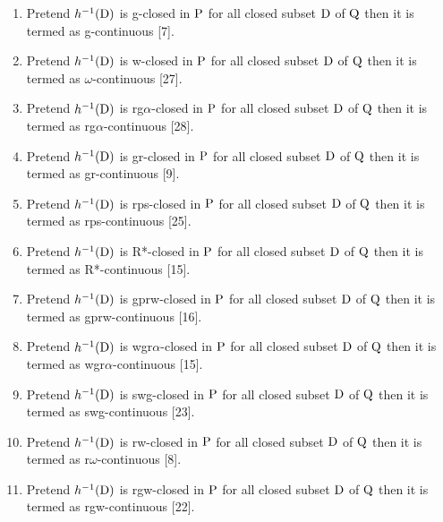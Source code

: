 \begin{dfn}
\begin{enumerate}
\item  Pretend $h^{-1}(\mathrm{D})$ is g-closed in $\mathrm{P}$ for all closed subset $\mathrm{D}$ of $\mathrm{Q}$ then it is termed as g-continuous [7]. 
\item  Pretend $h^{-1}(\mathrm{D})$ is w-closed in $\mathrm{P}$ for all closed subset $\mathrm{D}$ of $\mathrm{Q}$ then it is termed as $\omega$-continuous [27]. 
\item  Pretend $h^{-1}(\mathrm{D})$ is rg$\alpha$-closed in $\mathrm{P}$ for all closed subset $\mathrm{D}$ of $\mathrm{Q}$ then it is termed as rg$\alpha$-continuous [28]. 
\item  Pretend $h^{-1}(\mathrm{D})$ is gr-closed in $\mathrm{P}$ for all closed subset $\mathrm{D}$ of $\mathrm{Q}$ then it is termed as gr-continuous [9]. 
\item  Pretend $h^{-1}(\mathrm{D})$ is rps-closed in $\mathrm{P}$ for all closed subset $\mathrm{D}$ of $\mathrm{Q}$ then it is termed as rps-continuous [25]. 
\item  Pretend $h^{-1}(\mathrm{D})$ is R*-closed in $\mathrm{P}$ for all closed subset $\mathrm{D}$ of $\mathrm{Q}$ then it is termed as R*-continuous [15]. 
\item  Pretend $h^{-1}(\mathrm{D})$ is gprw-closed in $\mathrm{P}$ for all closed subset $\mathrm{D}$ of $\mathrm{Q}$ then it is termed as gprw-continuous [16]. 
\item  Pretend $h^{-1}(\mathrm{D})$ is wgr$\alpha$-closed in $\mathrm{P}$ for all closed subset $\mathrm{D}$ of $\mathrm{Q}$ then it is termed as wgr$\alpha$-continuous [15]. 
\item  Pretend $h^{-1}(\mathrm{D})$ is swg-closed in $\mathrm{P}$ for all closed subset $\mathrm{D}$ of $\mathrm{Q}$ then it is termed as swg-continuous [23]. 
\item  Pretend $h^{-1}(\mathrm{D})$ is rw-closed in $\mathrm{P}$ for all closed subset $\mathrm{D}$ of $\mathrm{Q}$ then it is termed as r$\omega$-continuous [8]. 
\item  Pretend $h^{-1}(\mathrm{D})$ is rgw-closed in $\mathrm{P}$ for all closed subset $\mathrm{D}$ of $\mathrm{Q}$ then it is termed as rgw-continuous [22]. 
\end{enumerate}
\end{dfn}

